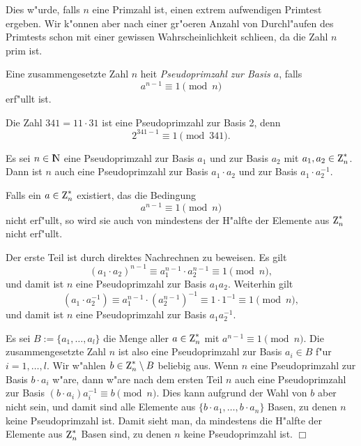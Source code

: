 Dies w"urde, falls $n$ eine Primzahl ist, einen extrem aufwendigen
Primtest ergeben. Wir k"onnen aber nach einer gr"o\3eren Anzahl von
Durchl"aufen des Primtests schon mit einer gewissen Wahrscheinlichkeit
schlie\3en, da\3 die Zahl $n$ prim ist.

\begin{definition}
  Eine zusammengesetzte Zahl $n$ hei\3t {\em Pseudoprimzahl zur Basis $a$}, falls
  $$ a^{n-1} \equiv 1 \pmod{n} $$
  erf"ullt ist.
\end{definition}

\begin{beispiel}  
  Die Zahl $341=11\cdot 31$ ist eine Pseudoprimzahl zur Basis 2, denn
  $$ 2^{341-1} \equiv 1 \pmod{341}. $$
\end{beispiel}

\begin{satz}
  Es sei $n\in\N$ eine Pseudoprimzahl zur Basis $a_1$ und zur Basis
  $a_2$ mit $a_1, a_2\in\einheit{n}$. Dann ist $n$ auch eine
  Pseudoprimzahl zur Basis $a_1 \cdot a_2$ und zur Basis $a_1 \cdot
  a_2^{-1}$.

  Falls ein $a\in \einheit{n}$ existiert, das die Bedingung
  $$ a^{n-1} \equiv 1 \pmod{n} $$ nicht erf"ullt, so wird sie auch von
  mindestens der H"alfte der Elemente aus $\einheit{n}$ nicht
  erf"ullt.
\end{satz}

\beweis 
Der erste Teil ist durch direktes Nachrechnen zu beweisen. Es gilt
$$(a_1\cdot a_2)^{n-1} \equiv a_1^{n-1} \cdot a_2^{n-1} \equiv 1
\pmod{n},$$ und damit ist $n$ eine Pseudoprimzahl zur Basis $a_1
a_2$. Weiterhin gilt
$$(a_1 \cdot a_2^{-1}) \equiv a_1^{n-1} \cdot (a_2^{n-1})^{-1} \equiv
1 \cdot 1^{-1} \equiv 1 \pmod{n},$$ und damit ist $n$ eine
Pseudoprimzahl zur Basis $a_1 a_2^{-1}$.

Es sei $B:=\{a_1,\ldots, a_l\}$ die Menge aller $a\in\einheit{n}$ mit
$a^{n-1} \equiv 1 \pmod{n}$.  Die zusammengesetzte Zahl $n$ ist also
eine Pseudoprimzahl zur Basis $a_i\in B$ f"ur $i=1,\ldots, l$. Wir
w"ahlen $b\in\einheit{n}\setminus B$ beliebig aus. Wenn $n$ eine
Pseudoprimzahl zur Basis $b \cdot a_i$ w"are, dann w"are nach dem
ersten Teil $n$ auch eine Pseudoprimzahl zur Basis $(b \cdot a_i)
a_i^{-1} \equiv b \pmod{n}$. Dies kann aufgrund der Wahl von $b$ aber
nicht sein, und damit sind alle Elemente aus $\{ b \cdot a_1, \ldots,
b \cdot a_n\}$ Basen, zu denen $n$ keine Pseudoprimzahl ist. Damit
sieht man, da\3 mindestens die H"alfte der Elemente aus $\einheit{n}$
Basen sind, zu denen $n$ keine Pseudoprimzahl ist. \hfill $\Box$

